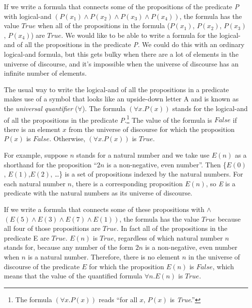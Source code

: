 {{If we write a formula that connects some of the propositions
of the predicate \emph{P} with logical-and
$(P(x_1) \wedge P(x_2) \wedge P(x_3) \wedge P(x_4))$,
the formula has the value $True$
when all of the propositions in the formula ($P(x_1)$, $P(x_2)$, $P(x_3)$, $P(x_4)$)
are $True$.
We would like to be able to write a formula
for the logical-and of all the propositions in the predicate \emph{P}.
We could do this with an ordinary logical-and formula,
but this gets bulky when there are a lot of elements
in the universe of discourse,
and it's impossible when the universe of discourse
has an infinite number of elements.

The usual way to write the logical-and of all the propositions in a predicate
makes use of a symbol that looks like an upside-down letter A
and is known as the
\label{def:universal-quantifier}\emph{universal quantifier} ($\forall$).
The  formula $(\forall x.P(x))$
stands for the logical-and of all the propositions in the predicate
\emph{P}.\footnote{The
formula $(\forall x. P(x))$ reads ``for all $x$, $P(x)$ is \emph{True}.''}
The value of the formula is $False$
if there is an element $x$ from the universe of discourse
for which the proposition $P(x)$ is $False$.
Otherwise, $(\forall x.P(x))$ is $True$.

For example, suppose $n$ stands for a natural number
and we take use
$E(n)$ as a shorthand for the proposition ``$2n$ is a non-negative, even number''.
Then \{$E(0)$, $E(1)$,$E(2)$, \dots\}
is a set of propositions indexed by the natural numbers.
For each natural number $n$, there is a corresponding proposition $E(n)$,
so \emph{E} is a predicate with the natural numbers
as its universe of discourse.

If we write a formula that connects some of these propositions with $\wedge$
$(E(5) \wedge E(3) \wedge E(7) \wedge E(1))$,
the formula has the value $True$
because all four of those propositions are $True$.
In fact all of the propositions in the predicate E are $True$.
$E(n)$ is $True$, regardless of which natural number $n$ stands for,
because any number of the form $2n$ is a non-negative, even number
when $n$ is a natural number.
Therefore, there is no element $n$ in the universe of discourse of
the predicate $E$ for which the proposition $E(n)$ is $False$,
which means that the value of the quantified formula $\forall n.E(n)$
is $True$.

}}
